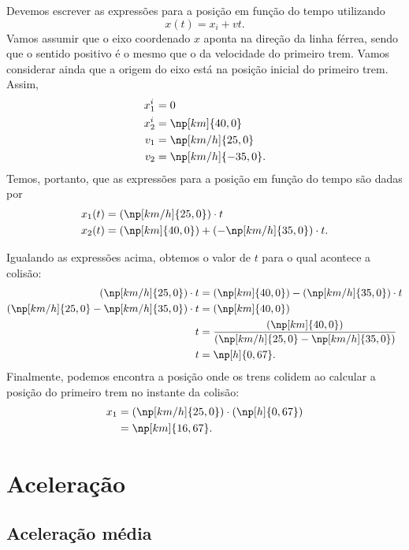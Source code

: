 Devemos escrever as expressões para a posição em função do tempo utilizando
\begin{equation}
	x(t) = x_i + vt.
\end{equation}
%
Vamos assumir que o eixo coordenado $x$ aponta na direção da linha férrea, sendo que o sentido positivo é o mesmo que o da velocidade do primeiro trem. Vamos considerar ainda que a origem do eixo está na posição inicial do primeiro trem. Assim,
\begin{align}
	x_1^i &= 0 \\
	x_2^i &= \np[km]{40,0} \\  
	v_1 &= \np[km/h]{25,0} \\
	v_2 &= \np[km/h]{-35,0}.
\end{align}
%
Temos, portanto, que as expressões para a posição em função do tempo são dadas por
\begin{align}
	x_1(t) &= (\np[km/h]{25,0})\cdot t \\
	x_2(t) &= (\np[km]{40,0}) + (-\np[km/h]{35,0})\cdot t.
\end{align}

Igualando as expressões acima, obtemos o valor de $t$ para o qual acontece a colisão:
\begin{align}
	(\np[km/h]{25,0})\cdot t &= (\np[km]{40,0}) - (\np[km/h]{35,0})\cdot t \\
	(\np[km/h]{25,0} - \np[km/h]{35,0})\cdot t &= (\np[km]{40,0}) \\
	t &=\frac{(\np[km]{40,0})}{(\np[km/h]{25,0} - \np[km/h]{35,0})} \\
	t &= \np[h]{0,67}.
\end{align}
%
Finalmente, podemos encontra a posição onde os trens colidem ao calcular a posição do primeiro trem no instante da colisão:
\begin{align}
	x_1 &= (\np[km/h]{25,0})\cdot (\np[h]{0,67}) \\
	&= \np[km]{16,67}.
\end{align}

\section{Aceleração}

\subsection{Aceleração média}

